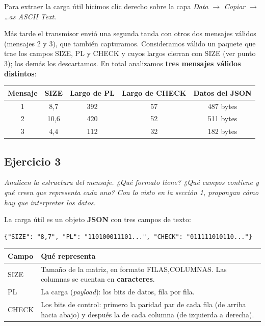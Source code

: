 \documentclass[11pt,a4paper]{article}
\begin{document}
Para extraer la carga útil hicimos clic derecho sobre la capa \textit{Data} $\rightarrow$ \textit{Copiar} $\rightarrow$ \textit{\ldots as ASCII Text}.

Más tarde el transmisor envió una segunda tanda con otros dos mensajes válidos (mensajes 2 y 3), que también capturamos. Consideramos válido un paquete que trae los campos SIZE, PL y CHECK y cuyos largos cierran con SIZE (ver punto 3); los demás los descartamos. En total analizamos \textbf{tres mensajes válidos distintos}:

\begin{center}
\begin{tabular}{|c|c|c|c|c|}
\hline
\textbf{Mensaje} & \textbf{SIZE} & \textbf{Largo de PL} & \textbf{Largo de CHECK} & \textbf{Datos del JSON} \\
\hline
1 & 8,7 & 392 & 57 & 487 bytes \\
2 & 10,6 & 420 & 52 & 511 bytes \\
3 & 4,4 & 112 & 32 & 182 bytes \\
\hline
\end{tabular}
\end{center}

\subsection*{Ejercicio 3}

\textit{Analicen la estructura del mensaje. ¿Qué formato tiene? ¿Qué campos contiene y qué creen que representa cada uno? Con lo visto en la sección 1, propongan cómo hay que interpretar los datos.}

\medskip

La carga útil es un objeto \textbf{JSON} con tres campos de texto:

\begin{verbatim}
{"SIZE": "8,7", "PL": "110100011101...", "CHECK": "011111010110..."}
\end{verbatim}

\begin{center}
\begin{tabular}{|l|p{11cm}|}
\hline
\textbf{Campo} & \textbf{Qué representa} \\
\hline
SIZE & Tamaño de la matriz, en formato FILAS,COLUMNAS. Las columnas se cuentan en \textbf{caracteres}. \\
PL & La carga (\textit{payload}): los bits de datos, fila por fila. \\
CHECK & Los bits de control: primero la paridad par de cada fila (de arriba hacia abajo) y después la de cada columna (de izquierda a derecha). \\
\hline
\end{tabular}
\end{center}
\end{document}
